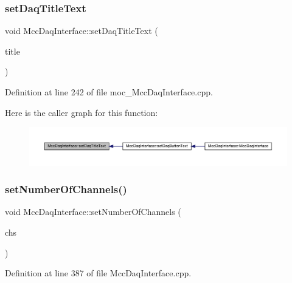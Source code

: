 \subsubsection{\texorpdfstring{set\+Daq\+Title\+Text}{setDaqTitleText}}
{\footnotesize\ttfamily void Mcc\+Daq\+Interface\+::set\+Daq\+Title\+Text (\begin{DoxyParamCaption}\item[{Q\+String}]{title }\end{DoxyParamCaption})\hspace{0.3cm}{\ttfamily [signal]}}



Definition at line 242 of file moc\+\_\+\+Mcc\+Daq\+Interface.\+cpp.

Here is the caller graph for this function\+:
\nopagebreak
\begin{figure}[H]
\begin{center}
\leavevmode
\includegraphics[width=350pt]{class_mcc_daq_interface_aaaf6dfded2d522b1310c7f7dc3171168_icgraph}
\end{center}
\end{figure}
\mbox{\label{class_mcc_daq_interface_a82ca01bbe3fcf58de7e4fdfc3d1aa379}} 
\subsubsection{\texorpdfstring{set\+Number\+Of\+Channels()}{setNumberOfChannels()}}
{\footnotesize\ttfamily void Mcc\+Daq\+Interface\+::set\+Number\+Of\+Channels (\begin{DoxyParamCaption}\item[{long}]{chs }\end{DoxyParamCaption})}



Definition at line 387 of file Mcc\+Daq\+Interface.\+cpp.

